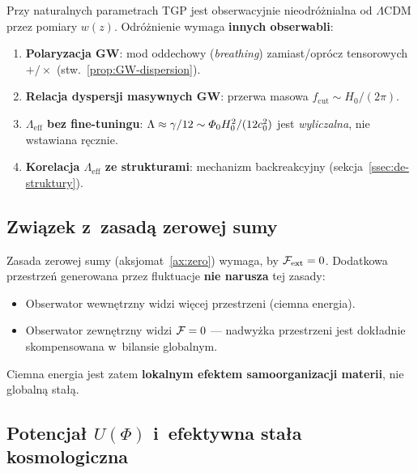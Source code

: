 \begin{remark}\label{rem:rozroznienie}
Przy naturalnych parametrach TGP jest obserwacyjnie
nieodr\'o\.znialna od $\Lambda$CDM przez pomiary $w(z)$.
Odr\'o\.znienie wymaga \textbf{innych obserwabli}:
\begin{enumerate}[nosep]
  \item \textbf{Polaryzacja GW}: mod oddechowy (\emph{breathing})
        zamiast/opr\'ocz tensorowych $+/\times$
        (stw.~\ref{prop:GW-dispersion}).
  \item \textbf{Relacja dyspersji masywnych GW}:
        przerwa masowa $f_{\mathrm{cut}} \sim H_0/(2\pi)$.
  \item \textbf{$\Lambda_{\mathrm{eff}}$ bez fine-tuningu}:
        $\Lambda \approx \gamma/12 \sim \varPhi_0 H_0^2/(12 c_0^2)$
        jest \emph{wyliczalna}, nie wstawiana r\k{e}cznie.
  \item \textbf{Korelacja $\Lambda_{\mathrm{eff}}$
        ze strukturami}: mechanizm backreakcyjny
        (sekcja~\ref{ssec:de-struktury}).
\end{enumerate}
\end{remark}

\subsection{Zwi\k{a}zek z~zasad\k{a} zerowej sumy}\label{ssec:de-zero}

Zasada zerowej sumy (aksjomat~\ref{ax:zero}) wymaga, by
$\mathcal{F}_{\mathrm{ext}} = 0$. Dodatkowa przestrze\'n
generowana przez fluktuacje \textbf{nie narusza} tej zasady:
\begin{itemize}[nosep]
  \item Obserwator wewn\k{e}trzny widzi wi\k{e}cej przestrzeni
        (ciemna energia).
  \item Obserwator zewn\k{e}trzny widzi $\mathcal{F} = 0$ ---
        nadwy\.zka przestrzeni jest dok\l{}adnie skompensowana
        w~bilansie globalnym.
\end{itemize}

Ciemna energia jest zatem \textbf{lokalnym efektem
samoorganizacji materii}, nie globaln\k{a} sta\l{}\k{a}.

\subsection{Potencja\l{} $U(\Phi)$ i~efektywna sta\l{}a kosmologiczna}\label{ssec:de-potencjal}

